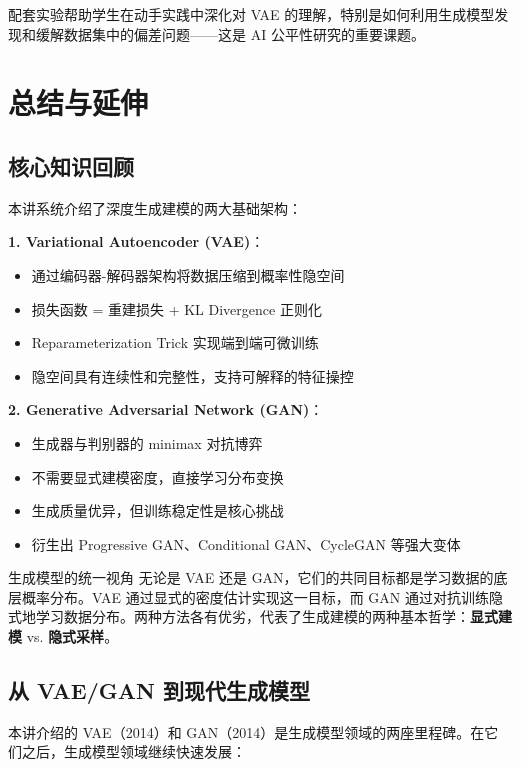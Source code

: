\documentclass[a4paper]{article}
\begin{document}
配套实验帮助学生在动手实践中深化对 VAE 的理解，特别是如何利用生成模型发现和缓解数据集中的偏差问题——这是 AI 公平性研究的重要课题。


\section{总结与延伸}

\subsection{核心知识回顾}

本讲系统介绍了深度生成建模的两大基础架构：

\textbf{1. Variational Autoencoder (VAE)}：
\begin{itemize}
    \item 通过编码器-解码器架构将数据压缩到概率性隐空间
    \item 损失函数 = 重建损失 + KL Divergence 正则化
    \item Reparameterization Trick 实现端到端可微训练
    \item 隐空间具有连续性和完整性，支持可解释的特征操控
\end{itemize}

\textbf{2. Generative Adversarial Network (GAN)}：
\begin{itemize}
    \item 生成器与判别器的 minimax 对抗博弈
    \item 不需要显式建模密度，直接学习分布变换
    \item 生成质量优异，但训练稳定性是核心挑战
    \item 衍生出 Progressive GAN、Conditional GAN、CycleGAN 等强大变体
\end{itemize}

\begin{importantbox}{生成模型的统一视角}
无论是 VAE 还是 GAN，它们的共同目标都是学习数据的底层概率分布。VAE 通过显式的密度估计实现这一目标，而 GAN 通过对抗训练隐式地学习数据分布。两种方法各有优劣，代表了生成建模的两种基本哲学：\textbf{显式建模} vs. \textbf{隐式采样}。
\end{importantbox}

\subsection{从 VAE/GAN 到现代生成模型}

本讲介绍的 VAE（2014）和 GAN（2014）是生成模型领域的两座里程碑。在它们之后，生成模型领域继续快速发展：
\end{document}
